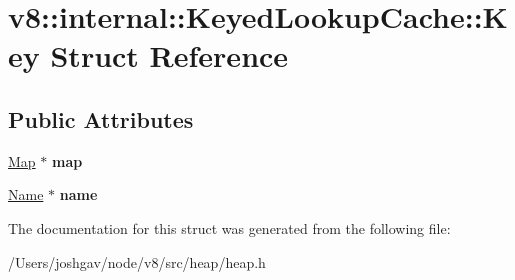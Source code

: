 \hypertarget{structv8_1_1internal_1_1_keyed_lookup_cache_1_1_key}{}\section{v8\+:\+:internal\+:\+:Keyed\+Lookup\+Cache\+:\+:Key Struct Reference}
\label{structv8_1_1internal_1_1_keyed_lookup_cache_1_1_key}
\subsection*{Public Attributes}
\begin{DoxyCompactItemize}
\item 
\hyperlink{classv8_1_1internal_1_1_map}{Map} $\ast$ {\bfseries map}\hypertarget{structv8_1_1internal_1_1_keyed_lookup_cache_1_1_key_a9454c0f8839823027c81223d690c0bb0}{}\label{structv8_1_1internal_1_1_keyed_lookup_cache_1_1_key_a9454c0f8839823027c81223d690c0bb0}

\item 
\hyperlink{classv8_1_1internal_1_1_name}{Name} $\ast$ {\bfseries name}\hypertarget{structv8_1_1internal_1_1_keyed_lookup_cache_1_1_key_a50749db2985453c6b555e49c78233ba7}{}\label{structv8_1_1internal_1_1_keyed_lookup_cache_1_1_key_a50749db2985453c6b555e49c78233ba7}

\end{DoxyCompactItemize}


The documentation for this struct was generated from the following file\+:\begin{DoxyCompactItemize}
\item 
/\+Users/joshgav/node/v8/src/heap/heap.\+h\end{DoxyCompactItemize}
